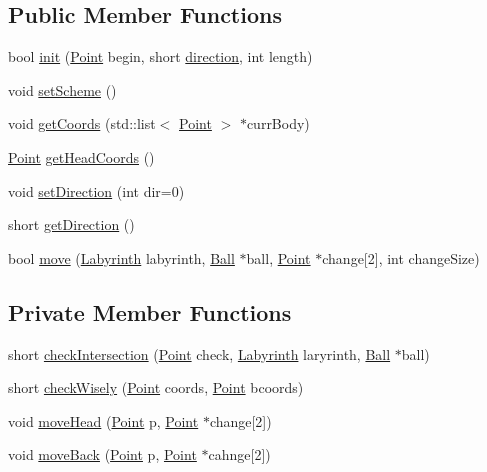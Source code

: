 \subsection*{Public Member Functions}
\begin{DoxyCompactItemize}
\item 
bool \hyperlink{class_snake_a953fb7b8be521f651989bb53323e89ec}{init} (\hyperlink{common_8h_aa9cfdb80b4ca12013a2de8a3b9b97981}{Point} begin, short \hyperlink{class_snake_aee6d8cb1404c33a9b7e132a99e055590}{direction}, int length)
\item 
void \hyperlink{class_snake_a0c305e807c15736f809eb035d947c988}{set\-Scheme} ()
\item 
void \hyperlink{class_snake_a62fa59de03f60c23f6d1100c53594d71}{get\-Coords} (std\-::list$<$ \hyperlink{common_8h_aa9cfdb80b4ca12013a2de8a3b9b97981}{Point} $>$ $\ast$curr\-Body)
\item 
\hyperlink{common_8h_aa9cfdb80b4ca12013a2de8a3b9b97981}{Point} \hyperlink{class_snake_a0235581bc3d6399f4fd2287669f93cee}{get\-Head\-Coords} ()
\item 
void \hyperlink{class_snake_a151d9cab8233d38524c09642d079356a}{set\-Direction} (int dir=0)
\item 
short \hyperlink{class_snake_a2656a9a4490cbb70d305c323269cc5bd}{get\-Direction} ()
\item 
bool \hyperlink{class_snake_a6181d41b0920aff3fda1a90d59e8d382}{move} (\hyperlink{class_labyrinth}{Labyrinth} labyrinth, \hyperlink{class_ball}{Ball} $\ast$ball, \hyperlink{common_8h_aa9cfdb80b4ca12013a2de8a3b9b97981}{Point} $\ast$change\mbox{[}2\mbox{]}, int change\-Size)
\end{DoxyCompactItemize}
\subsection*{Private Member Functions}
\begin{DoxyCompactItemize}
\item 
short \hyperlink{class_snake_a7df802733cb62081ea360bb81ba9f304}{check\-Intersection} (\hyperlink{common_8h_aa9cfdb80b4ca12013a2de8a3b9b97981}{Point} check, \hyperlink{class_labyrinth}{Labyrinth} laryrinth, \hyperlink{class_ball}{Ball} $\ast$ball)
\item 
short \hyperlink{class_snake_a2f8cc670284cdebf4c9bbe60a7296deb}{check\-Wisely} (\hyperlink{common_8h_aa9cfdb80b4ca12013a2de8a3b9b97981}{Point} coords, \hyperlink{common_8h_aa9cfdb80b4ca12013a2de8a3b9b97981}{Point} bcoords)
\item 
void \hyperlink{class_snake_a59b2f5b18ab563d1583dfb15064784a0}{move\-Head} (\hyperlink{common_8h_aa9cfdb80b4ca12013a2de8a3b9b97981}{Point} p, \hyperlink{common_8h_aa9cfdb80b4ca12013a2de8a3b9b97981}{Point} $\ast$change\mbox{[}2\mbox{]})
\item 
void \hyperlink{class_snake_a577892c68b457316f7a9f3944c464569}{move\-Back} (\hyperlink{common_8h_aa9cfdb80b4ca12013a2de8a3b9b97981}{Point} p, \hyperlink{common_8h_aa9cfdb80b4ca12013a2de8a3b9b97981}{Point} $\ast$cahnge\mbox{[}2\mbox{]})
\end{DoxyCompactItemize}
